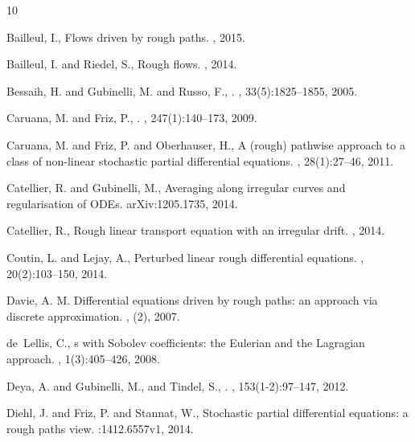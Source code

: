 \documentclass[11pt,a4paper]{amsart}
\numberwithin{equation}{section} %
\begin{document}
\bigskip

\begin{thebibliography}{10}

Bailleul, I.,
\newblock Flows driven by rough paths.
, 2015.


Bailleul, I. and Riedel, S.,
\newblock Rough flows.
, 2014.

Bessaih, H. and  Gubinelli, M. and Russo, F.,
.
, 33(5):1825--1855, 2005.



 Caruana, M. and Friz, P.,
.
, 247(1):140--173, 2009.

Caruana, M. and Friz, P. and Oberhauser, H.,
\newblock A (rough) pathwise approach to a class of non-linear stochastic partial differential equations.
, 28(1):27--46, 2011.

Catellier, R. and Gubinelli, M.,
\newblock Averaging along irregular curves and regularisation of ODEs.
\newblock arXiv:1205.1735, 2014.

Catellier, R.,
\newblock Rough linear transport equation with an irregular drift.
, 2014.

Coutin, L. and Lejay, A.,
\newblock Perturbed linear rough differential equations.
, 20(2):103--150, 2014.


Davie, A. M.
\newblock Differential equations driven by rough paths: an approach via discrete approximation.
, (2), 2007.

de~Lellis, C.,
s with {S}obolev coefficients: the {E}ulerian and the {L}agragian approach.
, 1(3):405--426, 2008.

Deya, A. and Gubinelli, M., and  Tindel, S.,
.
, 153(1-2):97--147, 2012.

Diehl, J. and Friz, P. and Stannat, W.,
\newblock Stochastic partial differential equations: a rough paths view.
:1412.6557v1, 2014.


\end{thebibliography}
\end{document}
